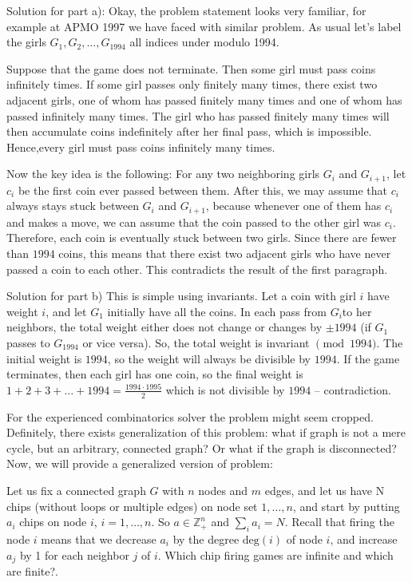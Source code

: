 \sol 

Solution for part a): Okay, the problem statement looks very familiar, for example at APMO 1997 we have faced with similar problem. As usual let's label the girls $G_1, G_2, \dots, G_{1994}$ all indices under modulo 1994.

Suppose that the game does not terminate. Then some girl must pass coins infinitely times. If some girl passes only finitely many times, there exist two adjacent girls, one of whom has passed finitely many times and one of whom has passed infinitely many times. The girl who has passed finitely many times will then accumulate coins indefinitely after her final pass, which is impossible. Hence,every girl must pass coins infinitely many times. 

Now the key idea is the following: For any two neighboring girls $G_i$ and $G_{i+1}$, let $c_i$ be the first coin ever passed between them. After this, we may assume that $c_i$ always stays stuck between $G_i$ and $G_{i+1}$, because whenever one of them has $c_i$ and makes a move, we can assume that the coin passed to the other girl was $c_i$. Therefore, each coin is eventually stuck between two girls. Since there are fewer than $1994$ coins, this means that there exist two adjacent girls who have never passed a coin to each other. This contradicts the result of the first paragraph.

Solution for part b) This is simple using invariants. Let a coin with girl $i$ have weight $i$, and let $G_1$ initially have all the coins. In each pass from $G_i$to her neighbors, the total weight either does not change or changes by $\pm 1994$ (if $G_1$ passes to $G_{1994}$ or vice versa). So, the total weight is invariant $\pmod{1994}$. The initial weight is $1994$, so the weight will always be divisible by $1994$. If the game terminates, then each girl has one coin, so the final weight is $1+2+3+\dots+1994 = \frac{1994\cdot1995}{2}$ which is not divisible by $1994$ -- contradiction.

For the experienced combinatorics solver the problem might seem cropped. Definitely, there exists generalization of this problem: what if graph is not a mere cycle, but an arbitrary, connected graph? Or what if the graph is disconnected? Now, we will provide a generalized version of problem:

\begin{example}
    Let us fix a connected graph \( G \) with $n$ nodes and $m$ edges, and let us have N chips (without loops or multiple edges) on node set \( 1, \dots, n \), and start by putting \( a_i \) chips on node \( i \), \( i = 1, \dots, n \). So \( a \in \mathbb{Z}^n_+ \) and \( \sum_i a_i = N \). Recall that firing the node \( i \) means that we decrease \( a_i \) by the degree \( \text{deg}(i) \) of node \( i \), and increase \( a_j \) by 1 for each neighbor \( j \) of \( i \).  Which chip firing games are infinite and which are finite?.
\end{example}

